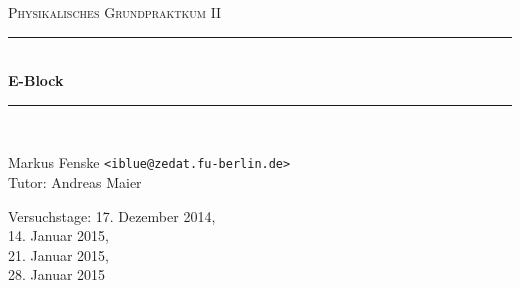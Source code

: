\newcommand{\HRule}{\rule{\linewidth}{0.5mm}}

\begin{center}
  \textsc{\Large Physikalisches Grundpraktkum II}
  \HRule\\[0.4 cm]
  {\huge \bfseries E-Block}
  \HRule\\[0.4 cm]

  \begin{minipage}{0.60\textwidth}
  \begin{flushleft}
    Markus Fenske \texttt{<iblue@zedat.fu-berlin.de>} \\
    Tutor: Andreas Maier
    \vspace{16mm}
  \end{flushleft}
  \end{minipage}
  \hfill
  \begin{minipage}{0.35\textwidth}
  \begin{flushright}
    Versuchstage: 17. Dezember 2014,\\ 14. Januar 2015,\\ 21. Januar 2015,\\ 28. Januar 2015\;
  \end{flushright}
  \end{minipage}

  \vspace{1cm}

  \tableofcontents


  \vfill
\end{center}
\newpage
